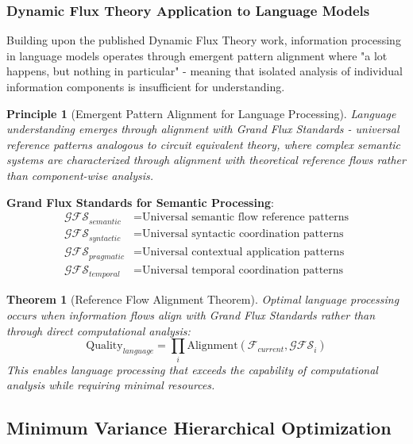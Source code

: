 \documentclass[12pt,a4paper]{article}
\newtheorem{theorem}{Theorem}
\newtheorem{principle}{Principle}
\begin{document}
\subsubsection{Dynamic Flux Theory Application to Language Models}

Building upon the published Dynamic Flux Theory work, information processing in language models operates through emergent pattern alignment where "a lot happens, but nothing in particular" - meaning that isolated analysis of individual information components is insufficient for understanding.

\begin{principle}[Emergent Pattern Alignment for Language Processing]
Language understanding emerges through alignment with Grand Flux Standards - universal reference patterns analogous to circuit equivalent theory, where complex semantic systems are characterized through alignment with theoretical reference flows rather than component-wise analysis.
\end{principle}

\textbf{Grand Flux Standards for Semantic Processing}:
\begin{align}
\mathcal{GFS}_{semantic} &= \text{Universal semantic flow reference patterns} \\
\mathcal{GFS}_{syntactic} &= \text{Universal syntactic coordination patterns} \\
\mathcal{GFS}_{pragmatic} &= \text{Universal contextual application patterns} \\
\mathcal{GFS}_{temporal} &= \text{Universal temporal coordination patterns}
\end{align}

\begin{theorem}[Reference Flow Alignment Theorem]
Optimal language processing occurs when information flows align with Grand Flux Standards rather than through direct computational analysis:
\begin{equation}
\text{Quality}_{language} = \prod_{i} \text{Alignment}(\mathcal{F}_{current}, \mathcal{GFS}_i)
\end{equation}
This enables language processing that exceeds the capability of computational analysis while requiring minimal resources.
\end{theorem}

\subsection{Minimum Variance Hierarchical Optimization}
\end{document}
